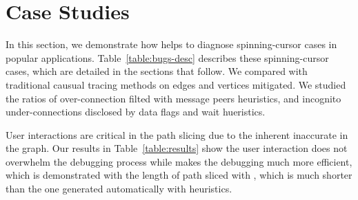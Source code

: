 \section{Case Studies}\label{sec:casestudy}

In this section, we demonstrate how \xxx helps to diagnose \nbug spinning-cursor
cases in \napps popular applications. Table~\ref{table:bugs-desc} describes
these spinning-cursor cases, which are detailed in the sections that follow.
We compared \xxx with traditional causual tracing methods on edges
and vertices \xxx mitigated. We studied the ratios of over-connection filted
with message peers heuristics, and incognito under-connections disclosed by data flags and wait
hueristics. 

User interactions are critical in the path slicing due to the inherent
inaccurate in the graph. Our results in Table~\ref{table:results} show the user
interaction does not overwhelm the debugging process while makes the debugging
much more efficient, which is demonstrated with the length of path sliced
with \xxx, which is much shorter than the one generated automatically with
heuristics.







